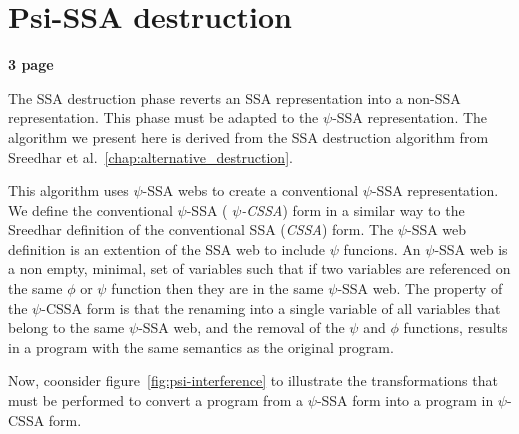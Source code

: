 \section{Psi-SSA destruction}
\label{sec:Psi_ssa_destruction}

\textbf{3 page}


The SSA destruction phase reverts an SSA representation into a non-SSA
representation. This phase must be adapted to the $\psi$-SSA
representation. The algorithm we present here is derived from the SSA
destruction algorithm from Sreedhar et
al.~\ref{chap:alternative_destruction}.

This algorithm uses $\psi$-SSA webs to create a conventional
$\psi$-SSA representation. We define the conventional $\psi$-SSA ({\em
  $\psi$-CSSA}) form in a similar way to the Sreedhar definition of
the conventional SSA ({\em CSSA}) form. The $\psi$-SSA web definition
is an extention of the SSA web to include $\psi$ funcions. An
$\psi$-SSA web is a non empty, minimal, set of variables such that if
two variables are referenced on the same $\phi$ or $\psi$ function
then they are in the same $\psi$-SSA web. The property of the
$\psi$-CSSA form is that the renaming into a single variable of all
variables that belong to the same $\psi$-SSA web, and the removal of
the $\psi$ and $\phi$ functions, results in a program with the same
semantics as the original program.

Now, coonsider figure~\ref{fig:psi-interference} to illustrate the
transformations that must be performed to convert a program from a
$\psi$-SSA form into a program in $\psi$-CSSA form.

